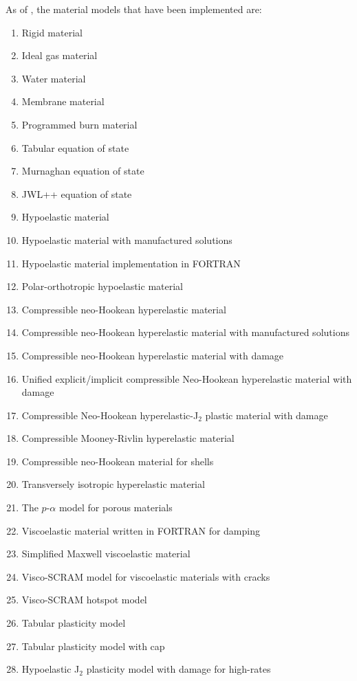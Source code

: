 As of \Vaango \version, the material models that have been implemented are:
\begin{enumerate}
  \item Rigid material
  \item Ideal gas material
  \item Water material
  \item Membrane material
  \item Programmed burn material
  \item Tabular equation of state
  \item Murnaghan equation of state
  \item JWL++ equation of state
  \item Hypoelastic material
  \item Hypoelastic material with manufactured solutions
  \item Hypoelastic material implementation in FORTRAN
  \item Polar-orthotropic hypoelastic material
  \item Compressible neo-Hookean hyperelastic material
  \item Compressible neo-Hookean hyperelastic material with manufactured solutions
  \item Compressible neo-Hookean hyperelastic material with damage
  \item Unified explicit/implicit compressible Neo-Hookean hyperelastic material with damage
  \item Compressible Neo-Hookean hyperelastic-J$_2$ plastic material with damage
  \item Compressible Mooney-Rivlin hyperelastic material
  \item Compressible neo-Hookean material for shells
  \item Transversely isotropic hyperelastic material
  \item The $p$-$\alpha$ model for porous materials
  \item Viscoelastic material written in FORTRAN for damping
  \item Simplified Maxwell viscoelastic material
  \item Visco-SCRAM model for viscoelastic materials with cracks
  \item Visco-SCRAM hotspot model
  \item Tabular plasticity model
  \item Tabular plasticity model with cap
  \item Hypoelastic J$_2$ plasticity model with damage for high-rates

\end{enumerate}
